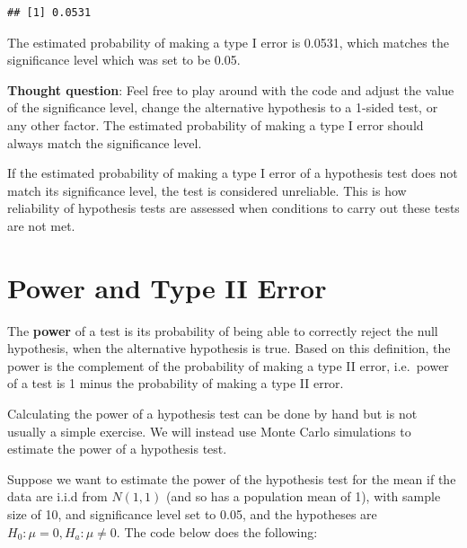 \documentclass[
]{book}
\theoremstyle{definition}
\theoremstyle{definition}
\theoremstyle{definition}
\theoremstyle{definition}
\theoremstyle{remark}
\begin{document}
\begin{verbatim}
## [1] 0.0531
\end{verbatim}

The estimated probability of making a type I error is 0.0531, which matches the significance level which was set to be 0.05.

\textbf{Thought question}: Feel free to play around with the code and adjust the value of the significance level, change the alternative hypothesis to a 1-sided test, or any other factor. The estimated probability of making a type I error should always match the significance level.

If the estimated probability of making a type I error of a hypothesis test does not match its significance level, the test is considered unreliable. This is how reliability of hypothesis tests are assessed when conditions to carry out these tests are not met.

\hypertarget{power}{%
\section{Power and Type II Error}\label{power}}

The \textbf{power} of a test is its probability of being able to correctly reject the null hypothesis, when the alternative hypothesis is true. Based on this definition, the power is the complement of the probability of making a type II error, i.e.~power of a test is 1 minus the probability of making a type II error.

Calculating the power of a hypothesis test can be done by hand but is not usually a simple exercise. We will instead use Monte Carlo simulations to estimate the power of a hypothesis test.

Suppose we want to estimate the power of the hypothesis test for the mean if the data are i.i.d from \(N(1,1)\) (and so has a population mean of 1), with sample size of 10, and significance level set to 0.05, and the hypotheses are \(H_0: \mu = 0, H_a: \mu \neq 0\). The code below does the following:
\end{document}

